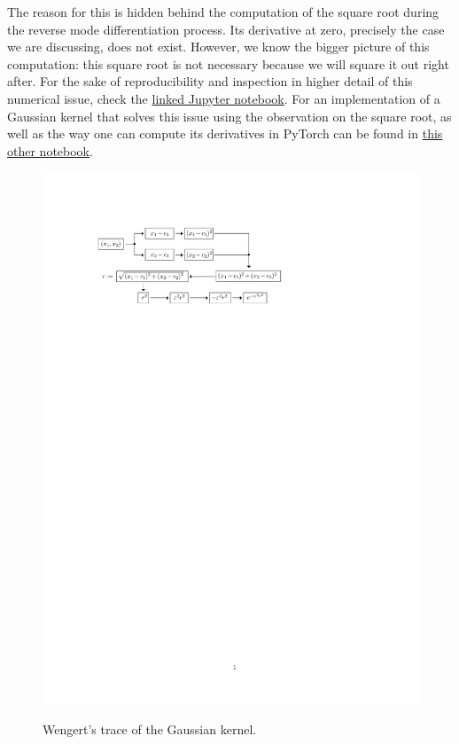 \documentclass[12pt]{report} %
\begin{document}
The reason for this is hidden behind the computation of the square root during the reverse
mode differentiation process. Its derivative at zero, precisely the case we
are discussing, does not exist.
However, we know the bigger picture of this computation: this square root is not
necessary because we will square it out right after. For the sake of reproducibility
and inspection in higher detail of this numerical issue, check the
\href{https://github.com/heqro/tfm-experiments/blob/main/introductory_notebooks/differentials_computation/differentials_rbf_NANs.ipynb}{linked
Jupyter notebook}. For an implementation of a Gaussian kernel that solves this issue
using the observation on the square root, as well
as the way one can compute its derivatives in PyTorch can be found in
\href{https://github.com/heqro/tfm-experiments/blob/main/introductory_notebooks/differentials_computation/differentials_rbf_NANs_fixed.ipynb}
{this other notebook}.

\begin{figure}
  {\includegraphics[width=.85\textwidth, trim={2cm 22cm 7cm 3cm}, clip=true]{imagenes/rbf_discussion/diagrama-gaussian-wengert.pdf}}
  \caption{Wengert's trace of the Gaussian kernel.}
  \label{fig:wenger-trace-gaussian}
\end{figure}
\end{document}
